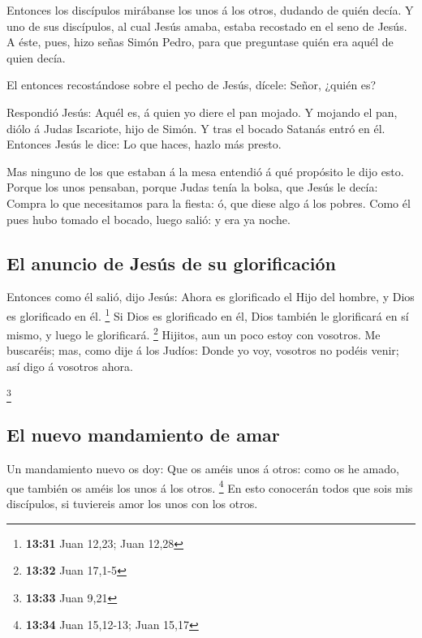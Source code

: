 Entonces los discípulos mirábanse los unos á los otros,
dudando de quién decía.  Y uno de sus discípulos, al cual
Jesús amaba, estaba recostado en el seno de Jesús.  A
éste, pues, hizo señas Simón Pedro, para que preguntase quién era aquél
de quien decía.

 El entonces recostándose sobre el pecho de Jesús,
dícele: Señor, ¿quién es?

 Respondió Jesús: Aquél es, á quien yo diere el pan
mojado. Y mojando el pan, diólo á Judas Iscariote, hijo de Simón.
 Y tras el bocado Satanás entró en él. Entonces Jesús le
dice: Lo que haces, hazlo más presto.

 Mas ninguno de los que estaban á la mesa entendió á qué
propósito le dijo esto.  Porque los unos pensaban, porque
Judas tenía la bolsa, que Jesús le decía: Compra lo que necesitamos para
la fiesta: ó, que diese algo á los pobres.  Como él pues
hubo tomado el bocado, luego salió: y era ya noche.

\hypertarget{el-anuncio-de-jesuxfas-de-su-glorificaciuxf3n}{%
\subsection{El anuncio de Jesús de su
glorificación}\label{el-anuncio-de-jesuxfas-de-su-glorificaciuxf3n}}

 Entonces como él salió, dijo Jesús: Ahora es glorificado
el Hijo del hombre, y Dios es glorificado en él. \footnote{\textbf{13:31}
  Juan 12,23; Juan 12,28}  Si Dios es glorificado en él,
Dios también le glorificará en sí mismo, y luego le glorificará.
\footnote{\textbf{13:32} Juan 17,1-5}  Hijitos, aun un
poco estoy con vosotros. Me buscaréis; mas, como dije á los Judíos:
Donde yo voy, vosotros no podéis venir; así digo á vosotros ahora.

\footnote{\textbf{13:33} Juan 9,21}

\hypertarget{el-nuevo-mandamiento-de-amar}{%
\subsection{El nuevo mandamiento de
amar}\label{el-nuevo-mandamiento-de-amar}}

 Un mandamiento nuevo os doy: Que os améis unos á otros:
como os he amado, que también os améis los unos á los otros. \footnote{\textbf{13:34}
  Juan 15,12-13; Juan 15,17}  En esto conocerán todos que
sois mis discípulos, si tuviereis amor los unos con los otros.

